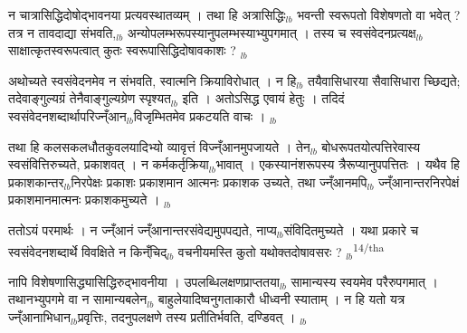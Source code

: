 \documentclass[article,12pt,a4paper]{memoir}%
\newcounter{parCount}
\begin{document}
	  
	  \pstart \leavevmode%
	न चात्रासिद्धिदोषोद्भावनया प्रत्यवस्थातव्यम् । तथा हि अत्रासिद्धिः{\tiny $_{lb}$} भवन्ती स्वरूपतो विशेषणतो वा भवेत् ? तत्र न तावदाद्या संभवति,{\tiny $_{lb}$} अन्योपलम्भरूपस्यानुपलम्भस्याभ्युपगमात् । तस्य च स्वसंवेदनप्रत्यक्ष{\tiny $_{lb}$}साक्षात्कृतस्वरूपत्वात् कुतः स्वरूपासिद्धिदोषावकाशः ?
	{}
	\pend%
      {\tiny $_{lb}$}

	  
	  \pstart \leavevmode%
	अथोच्यते स्वसंवेदनमेव न संभवति, स्वात्मनि क्रियाविरोधात् । न हि{\tiny $_{lb}$} तयैवासिधारया सैवासिधारा च्छिद्यते; तदेवाङ्गुल्यग्रं तेनैवाङ्गुल्यग्रेण स्पृश्यत{\tiny $_{lb}$} इति । अतोऽसिद्ध एवायं हेतुः । तदिदं स्वसंवेदनशब्दार्थापरिज्न्ँआन{\tiny $_{lb}$}विजृम्भितमेव प्रकटयति वाचः ।
	{}
	\pend%
      {\tiny $_{lb}$}

	  
	  \pstart \leavevmode%
	तथा हि कलसकलधौतकुवलयादिभ्यो व्यावृत्तं विज्न्ँआनमुपजायते । तेन{\tiny $_{lb}$} बोधरूपतयोत्पत्तिरेवास्य स्वसंवित्तिरुच्यते, प्रकाशवत् । न कर्मकर्तृक्रिया{\tiny $_{lb}$}भावात् । एकस्यानंशरूपस्य त्रैरूप्यानुपपत्तितः । यथैव हि प्रकाशकान्तर{\tiny $_{lb}$}निरपेक्षः प्रकाशः प्रकाशमान आत्मनः प्रकाशक उच्यते, तथा ज्न्ँआनमपि{\tiny $_{lb}$} ज्न्ँआनान्तरनिरपेक्षं प्रकाशमानमात्मनः प्रकाशकमुच्यते ।
	{}
	\pend%
      {\tiny $_{lb}$}

	  
	  \pstart \leavevmode%
	ततोऽयं पर\leavevmode{}मार्थः । न ज्न्ँआनं ज्न्ँआनान्तरसंवेद्यमुपपद्यते, नाप्य{\tiny $_{lb}$}संविदितमुच्यते । यथा प्रकारे च स्वसंवेदनशब्दार्थे विवक्षिते न किन्ँचिद्{\tiny $_{lb}$} वचनीयमस्ति कुतो यथोक्तदोषावसरः ?
	{}
	\pend%
      {\tiny $_{lb}$}\textsuperscript{\textenglish{14/tha}}

	  
	  \pstart \leavevmode%
	नापि विशेषणासिद्ध्यासिद्धिरुद्भावनीया । उपलब्धिलक्षणप्राप्ततया{\tiny $_{lb}$} सामान्यस्य स्वयमेव परैरुपगमात् । तथानभ्युपगमे वा न सामान्यबलेन{\tiny $_{lb}$} बाहुलेयादिष्वनुगताकारौ धीध्वनी स्याताम् । न हि यतो यत्र ज्न्ँआनाभिधान{\tiny $_{lb}$}प्रवृत्तिः, तदनुपलक्षणे तस्य प्रतीतिर्भवति, दण्डिवत् ।
	{}
	\pend%
      {\tiny $_{lb}$}
\end{document}
